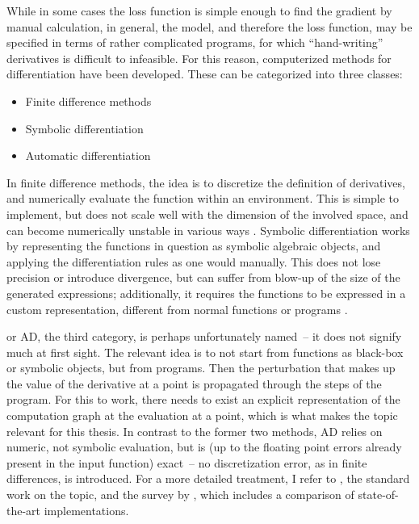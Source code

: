While in some cases the loss function is simple enough to find the gradient by manual calculation,
in general, the model, and therefore the loss function, may be specified in terms of rather
complicated programs, for which \enquote{hand-writing} derivatives is difficult to infeasible.  For
this reason, computerized methods for differentiation have been developed.  These can be categorized
into three classes:
\begin{itemize}
  \firmlist
\item Finite difference methods
\item Symbolic differentiation
\item Automatic differentiation
\end{itemize}
In finite difference methods, the idea is to discretize the definition of derivatives, and
numerically evaluate the function within an environment.  This is simple to implement, but does not
scale well with the dimension of the involved space, and can become numerically unstable in various
ways \parencite[section 5.7]{press2007numerical}.  Symbolic differentiation works by representing
the functions in question as symbolic algebraic objects, and applying the differentiation rules as
one would manually.  This does not lose precision or introduce divergence, but can suffer from
blow-up of the size of the generated expressions; additionally, it requires the functions to be
expressed in a custom representation, different from normal functions or programs
\parencite{baydin2018automatic}.

 or AD, the third category, is perhaps unfortunately named~--
it does not signify much at first sight.  The relevant idea is to not start from functions as
black-box or symbolic objects, but from programs.  Then the perturbation that makes up the value of
the derivative at a point is propagated through the steps of the program.  For this to work, there
needs to exist an explicit representation of the computation graph at the evaluation at a point,
which is what makes the topic relevant for this thesis.  In contrast to the former two methods, AD
relies on numeric, not symbolic evaluation, but is (up to the floating point errors already present
in the input function) exact~-- no discretization error, as in finite differences, is introduced.
For a more detailed treatment, I refer to \textcite{griewank2008evaluating}, the standard work on
the topic, and the survey by \textcite{baydin2018automatic}, which includes a comparison of
state-of-the-art implementations.

